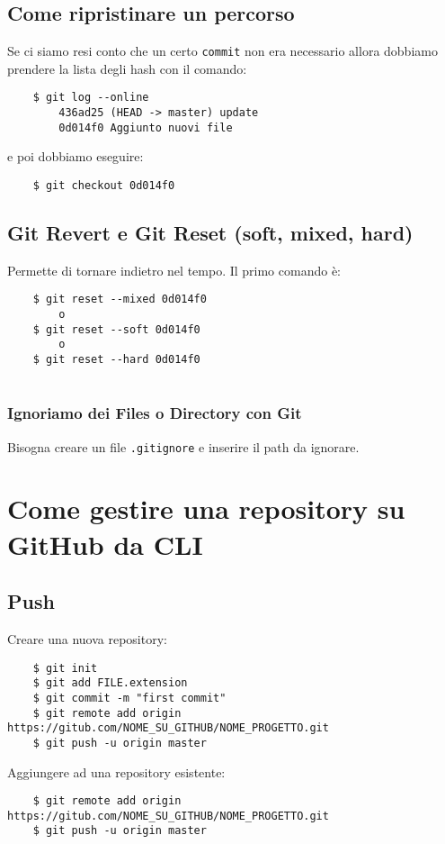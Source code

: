\documentclass{article}
\begin{document}
\subsection*{Come ripristinare un percorso}
Se ci siamo resi conto che un certo \texttt{commit} non era necessario allora dobbiamo prendere la lista degli hash con il comando:
\begin{verbatim}
    $ git log --online
        436ad25 (HEAD -> master) update
        0d014f0 Aggiunto nuovi file
\end{verbatim}
e poi dobbiamo eseguire:
\begin{verbatim}
    $ git checkout 0d014f0
\end{verbatim}

\subsection*{Git Revert e Git Reset (soft, mixed, hard)}
Permette di tornare indietro nel tempo. Il primo comando è:
\begin{verbatim}
    $ git reset --mixed 0d014f0
        o
    $ git reset --soft 0d014f0
        o
    $ git reset --hard 0d014f0
     
\end{verbatim}

\subsubsection*{Ignoriamo dei Files o Directory con Git}
Bisogna creare un file \texttt{.gitignore} e inserire il path da ignorare.

\section*{Come gestire una repository su GitHub da CLI}
\subsection*{Push}
Creare una nuova repository:
\begin{verbatim}
    $ git init
    $ git add FILE.extension
    $ git commit -m "first commit"
    $ git remote add origin https://gitub.com/NOME_SU_GITHUB/NOME_PROGETTO.git
    $ git push -u origin master
\end{verbatim}

Aggiungere ad una repository esistente:
\begin{verbatim}
    $ git remote add origin https://gitub.com/NOME_SU_GITHUB/NOME_PROGETTO.git
    $ git push -u origin master
\end{verbatim}
\end{document}
